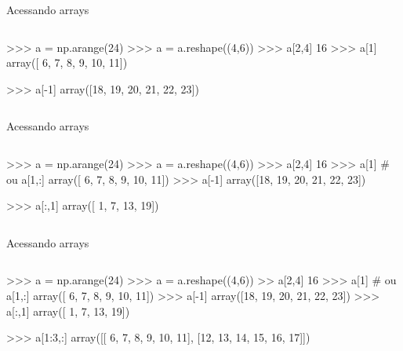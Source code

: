 \documentclass[12pt,t,graphics]{beamer}
\begin{document}
\begin{frame}[t,fragile]{Acessando arrays}
	\begin{columns}
		\begin{python}
>>> a = np.arange(24)
>>> a = a.reshape((4,6))
>>> a[2,4]
16
>>> a[1]
array([ 6,  7,  8,  9, 10, 11])
		
>>> a[-1]
array([18, 19, 20, 21, 22, 23])
		\end{python}
	\end{columns}
\end{frame}

\begin{frame}[t,fragile]{Acessando arrays}
	\begin{columns}
		\column{.5\textwidth}
		\begin{python}
>>> a = np.arange(24)
>>> a = a.reshape((4,6))
>>> a[2,4]
16
>>> a[1]  # ou a[1,:]
array([ 6,  7,  8,  9, 10, 11])
>>> a[-1]
array([18, 19, 20, 21, 22, 23])
		
>>> a[:,1]
array([ 1,  7, 13, 19])
		\end{python}
	\end{columns}
\end{frame}

\begin{frame}[t,fragile]{Acessando arrays}
	\begin{columns}
		\begin{python}
>>> a = np.arange(24)
>>> a = a.reshape((4,6))
>> a[2,4]
16
>>> a[1]  # ou a[1,:]
array([ 6,  7,  8,  9, 10, 11])
>>> a[-1]
array([18, 19, 20, 21, 22, 23])
>>> a[:,1]
array([ 1,  7, 13, 19])
		
>>> a[1:3,:]
array([[ 6,  7,  8,  9, 10, 11],
[12, 13, 14, 15, 16, 17]])		
		\end{python}
	\end{columns}
\end{frame}
\end{document}
